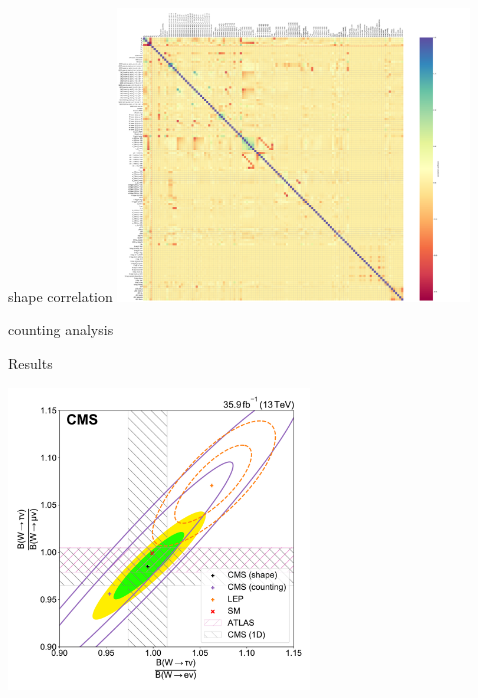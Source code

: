 \begin{frame}{shape correlation}
    \centering
    \includegraphics[width=0.7\textwidth]{chapters/Analysis/sectionSystematics/figures/correlation_matrix_full.pdf}
\end{frame}



\begin{frame}{}
\centering
counting analysis
    \begin{table}[]
        \setlength{\tabcolsep}{2em}
        \renewcommand{\arraystretch}{1}
        \resizebox{0.99\textwidth}{!}{}
    \end{table}
\end{frame}


\begin{frame}{Results}
    \begin{center}
        \includegraphics[width=0.6\textwidth]{chapters/Analysis/sectionResult/figures/result_contours_2d_ratio_integral.pdf}
    \end{center}
\end{frame}